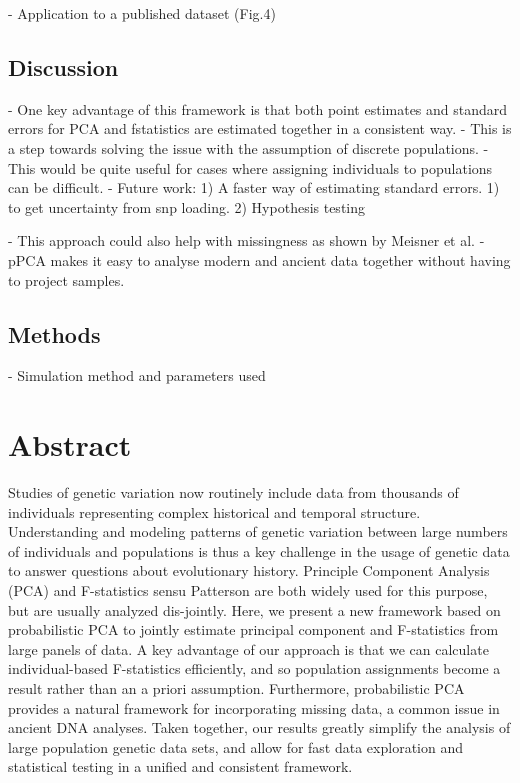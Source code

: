 \documentclass[12pt, letterpaper]{article}
\begin{document}
- Application to a published dataset (Fig.4)

\subsection{Discussion}
- One key advantage of this framework is that both point estimates and standard errors for PCA and fstatistics are estimated together in a consistent way.
- This is a step towards solving the issue with the assumption of discrete populations.
- This would be quite useful for cases where assigning individuals to populations can be difficult.
- Future work: 1) A faster way of estimating standard errors. 1) to get uncertainty from snp loading. 2) Hypothesis testing 

- This approach could also help with missingness as shown by Meisner et al. 
- pPCA makes it easy to analyse modern and ancient data together without having to project samples.

\subsection{Methods}
- Simulation method and parameters used


\section{Abstract}

Studies of genetic variation now routinely include data from thousands of individuals representing complex historical and temporal structure. Understanding and modeling patterns of genetic variation between large numbers of individuals and populations is thus a key challenge in the usage of genetic data to answer questions about evolutionary history. 
Principle Component Analysis (PCA) and F-statistics sensu Patterson are both widely used for this purpose, but are usually analyzed dis-jointly. Here, we present a new framework based on 
probabilistic PCA to jointly estimate principal component and F-statistics from large panels of data. A key advantage of our approach is that we can calculate individual-based F-statistics efficiently, and so population assignments become a result rather than an a priori assumption. Furthermore, probabilistic PCA provides a natural framework for incorporating missing data, a common issue in ancient DNA analyses. Taken together, our results greatly simplify the analysis of large population genetic data sets, and allow for fast data exploration and statistical testing in a unified and consistent framework.
\end{document}
